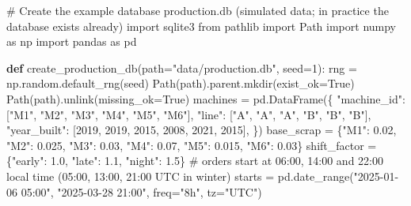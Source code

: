 \documentclass[
  letterpaper,
  DIV=11,
  numbers=noendperiod]{scrreprt}
\newenvironment{Shaded}{\begin{snugshade}}{\end{snugshade}}
\newcommand{\CommentTok}[1]{\textcolor[rgb]{0.37,0.37,0.37}{#1}}
\newcommand{\DecValTok}[1]{\textcolor[rgb]{0.68,0.00,0.00}{#1}}
\newcommand{\FloatTok}[1]{\textcolor[rgb]{0.68,0.00,0.00}{#1}}
\newcommand{\ImportTok}[1]{\textcolor[rgb]{0.00,0.46,0.62}{#1}}
\newcommand{\KeywordTok}[1]{\textcolor[rgb]{0.00,0.23,0.31}{\textbf{#1}}}
\newcommand{\NormalTok}[1]{\textcolor[rgb]{0.00,0.23,0.31}{#1}}
\newcommand{\OperatorTok}[1]{\textcolor[rgb]{0.37,0.37,0.37}{#1}}
\newcommand{\StringTok}[1]{\textcolor[rgb]{0.13,0.47,0.30}{#1}}
\newcommand{\VariableTok}[1]{\textcolor[rgb]{0.07,0.07,0.07}{#1}}
\begin{document}
\begin{Shaded}
\begin{Highlighting}[]
\CommentTok{\# Create the example database production.db (simulated data; in practice the database exists already)}
\ImportTok{import}\NormalTok{ sqlite3}
\ImportTok{from}\NormalTok{ pathlib }\ImportTok{import}\NormalTok{ Path}
\ImportTok{import}\NormalTok{ numpy }\ImportTok{as}\NormalTok{ np}
\ImportTok{import}\NormalTok{ pandas }\ImportTok{as}\NormalTok{ pd}

\KeywordTok{def}\NormalTok{ create\_production\_db(path}\OperatorTok{=}\StringTok{"data/production.db"}\NormalTok{, seed}\OperatorTok{=}\DecValTok{1}\NormalTok{):}
\NormalTok{    rng }\OperatorTok{=}\NormalTok{ np.random.default\_rng(seed)}
\NormalTok{    Path(path).parent.mkdir(exist\_ok}\OperatorTok{=}\VariableTok{True}\NormalTok{)}
\NormalTok{    Path(path).unlink(missing\_ok}\OperatorTok{=}\VariableTok{True}\NormalTok{)}
\NormalTok{    machines }\OperatorTok{=}\NormalTok{ pd.DataFrame(\{}
        \StringTok{"machine\_id"}\NormalTok{: [}\StringTok{"M1"}\NormalTok{, }\StringTok{"M2"}\NormalTok{, }\StringTok{"M3"}\NormalTok{, }\StringTok{"M4"}\NormalTok{, }\StringTok{"M5"}\NormalTok{, }\StringTok{"M6"}\NormalTok{],}
        \StringTok{"line"}\NormalTok{: [}\StringTok{"A"}\NormalTok{, }\StringTok{"A"}\NormalTok{, }\StringTok{"A"}\NormalTok{, }\StringTok{"B"}\NormalTok{, }\StringTok{"B"}\NormalTok{, }\StringTok{"B"}\NormalTok{],}
        \StringTok{"year\_built"}\NormalTok{: [}\DecValTok{2019}\NormalTok{, }\DecValTok{2019}\NormalTok{, }\DecValTok{2015}\NormalTok{, }\DecValTok{2008}\NormalTok{, }\DecValTok{2021}\NormalTok{, }\DecValTok{2015}\NormalTok{],}
\NormalTok{    \})}
\NormalTok{    base\_scrap }\OperatorTok{=}\NormalTok{ \{}\StringTok{"M1"}\NormalTok{: }\FloatTok{0.02}\NormalTok{, }\StringTok{"M2"}\NormalTok{: }\FloatTok{0.025}\NormalTok{, }\StringTok{"M3"}\NormalTok{: }\FloatTok{0.03}\NormalTok{, }\StringTok{"M4"}\NormalTok{: }\FloatTok{0.07}\NormalTok{, }\StringTok{"M5"}\NormalTok{: }\FloatTok{0.015}\NormalTok{, }\StringTok{"M6"}\NormalTok{: }\FloatTok{0.03}\NormalTok{\}}
\NormalTok{    shift\_factor }\OperatorTok{=}\NormalTok{ \{}\StringTok{"early"}\NormalTok{: }\FloatTok{1.0}\NormalTok{, }\StringTok{"late"}\NormalTok{: }\FloatTok{1.1}\NormalTok{, }\StringTok{"night"}\NormalTok{: }\FloatTok{1.5}\NormalTok{\}}
    \CommentTok{\# orders start at 06:00, 14:00 and 22:00 local time (05:00, 13:00, 21:00 UTC in winter)}
\NormalTok{    starts }\OperatorTok{=}\NormalTok{ pd.date\_range(}\StringTok{"2025{-}01{-}06 05:00"}\NormalTok{, }\StringTok{"2025{-}03{-}28 21:00"}\NormalTok{, freq}\OperatorTok{=}\StringTok{"8h"}\NormalTok{, tz}\OperatorTok{=}\StringTok{"UTC"}\NormalTok{)}

\end{Highlighting}
\end{Shaded}
\end{document}
